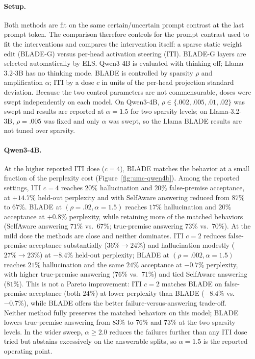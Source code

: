 \paragraph{Setup.}
Both methods are fit on the same certain/uncertain prompt contrast at the last prompt token. The
comparison therefore controls for the prompt contrast used to fit the interventions and compares the
intervention itself: a sparse static weight edit (BLADE-G) versus per-head activation steering (ITI).
BLADE-G layers are selected automatically by ELS. Qwen3-4B is evaluated with thinking off; Llama-3.2-3B
has no thinking mode. BLADE is controlled by sparsity $\rho$ and amplification $\alpha$; ITI by a dose $c$
in units of the per-head projection standard deviation. Because the two control parameters are not
commensurable, doses were swept independently on each model. On Qwen3-4B,
$\rho\in\{.002,.005,.01,.02\}$ was swept and results are reported at $\alpha{=}1.5$ for two sparsity
levels; on Llama-3.2-3B, $\rho{=}.005$ was fixed and only $\alpha$ was swept, so the Llama BLADE results
are not tuned over sparsity.

\paragraph{Qwen3-4B.}
At the higher reported ITI dose ($c{=}4$), BLADE matches the behavior at a small fraction of the
perplexity cost (Figure~\ref{fig:umc-qwen4b}). Among the reported settings, ITI $c{=}4$ reaches $20\%$
hallucination and $20\%$ false-premise acceptance, at $+14.7\%$ held-out perplexity and with SelfAware
answering reduced from $87\%$ to $67\%$. BLADE at $(\rho{=}.02,\alpha{=}1.5)$ reaches $17\%$
hallucination and $20\%$ acceptance at $+0.8\%$ perplexity, while retaining more of the matched behaviors
(SelfAware answering $71\%$ vs.\ $67\%$; true-premise answering $73\%$ vs.\ $70\%$). At the mild dose the
methods are close and neither dominates. ITI $c{=}2$ reduces false-premise acceptance substantially
($36\%\to24\%$) and hallucination modestly ($27\%\to23\%$) at $-8.4\%$ held-out perplexity; BLADE at
$(\rho{=}.002,\alpha{=}1.5)$ reaches $21\%$ hallucination and the same $24\%$ acceptance at $-0.7\%$
perplexity, with higher true-premise answering ($76\%$ vs.\ $71\%$) and tied SelfAware answering
($81\%$). This is not a Pareto improvement: ITI $c{=}2$ matches BLADE on false-premise acceptance (both
$24\%$) at lower perplexity than BLADE ($-8.4\%$ vs.\ $-0.7\%$), while BLADE offers the better
failure-versus-answering trade-off. Neither method fully preserves the matched behaviors on this model;
BLADE lowers true-premise answering from $83\%$ to $76\%$ and $73\%$ at the two sparsity levels. In the
wider sweep, $\alpha\ge2.0$ reduces the failures further than any ITI dose tried but abstains excessively
on the answerable splits, so $\alpha{=}1.5$ is the reported operating point.

